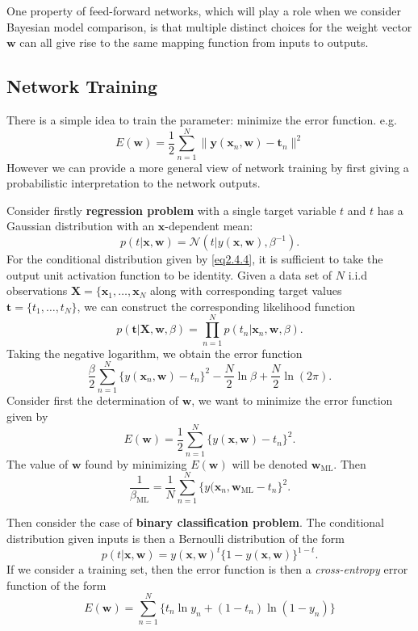 \documentclass{article}
\newcommand{\normD}{\mathcal{N}}
\newcommand{\mrm}{\mathrm}
\newcommand{\mbf}{\mathbf}
\newcommand{\XX}{\mbf X}
\newcommand{\ww}{\mbf w}
\newcommand{\ttt}{\mbf t}
\newcommand{\xx}{\mbf x}
\newcommand{\yy}{\mbf y}
\newcommand{\rev}{^{-1}}
\begin{document}
One property of feed-forward networks, which will play a role when we consider Bayesian model comparison, is that multiple distinct choices for the weight vector
$\ww$ can all give rise to the same mapping function from inputs to outputs.
\subsection{Network Training}
There is a simple idea to train the parameter: minimize the error function. e.g.
\begin{equation}\label{eq2.4.3}
  E(\ww) = \frac12\sum_{n=1}^N\|\yy(\xx_n,\ww)-\ttt_n\|^2
\end{equation}
However we can provide a more general view of network training by first giving a probabilistic interpretation to the network outputs.

Consider firstly \textbf{regression problem} with a single target variable $t$ and $t$ has a Gaussian distribution with an $\xx$-dependent mean:
\begin{equation}\label{eq2.4.4}
p(t|\xx,\ww)=\normD(t|y(\xx,\ww), \beta\rev).
\end{equation}
For the conditional distribution given by \ref{eq2.4.4}, it is sufficient to take the output unit activation function to be identity. Given a data set of $N$  i.i.d observations $\XX =\{\xx_1,\dots,\xx_N$ along with corresponding target values $\ttt = \{t_1,\dots,t_N\}$, we can construct the corresponding likelihood function
\begin{equation}\label{}
  p(\ttt|\XX,\ww,\beta)=\prod_{n=1}^{N}p(t_n|\xx_n,\ww,\beta).
\end{equation}
Taking the negative logarithm, we obtain the error function
\begin{equation}\label{}
  \frac{\beta}{2}\sum_{n=1}^{N}\{y(\xx_n,\ww)-t_n\}^2-\frac{N}{2}\ln \beta+\frac N2\ln(2\pi).
\end{equation}
Consider first the determination of $\ww$, we want to minimize the error function given by
\begin{equation}\label{}
  E(\ww)=\frac12\sum_{n=1}^{N}\{y(\xx,\ww)-t_n\}^2.
\end{equation}
The value of $\ww$ found by minimizing $E(\ww)$ will be denoted $\ww_{\mrm{ML}}$. Then
\begin{equation}\label{}
  \frac{1}{\beta_{\mrm{ML}}}=\frac1N\sum_{n=1}^{N}\{y(\xx_n,\ww_{\mrm{ML}}-t_n\}^2.
\end{equation}

Then consider the case of \textbf{binary classification problem}. The conditional distribution given inputs is then a Bernoulli distribution of the form
\begin{equation}\label{}
  p(t|\xx,\ww) = y(\xx,\ww)^t\{1-y(\xx,\ww)\}^{1-t}.
\end{equation}
If we consider a training set, then the error function is then a \textit{cross-entropy} error function  of the form
\begin{equation}\label{}
  E(\ww) = \sum_{n=1}^{N}\{t_n\ln y_n+(1-t_n)\ln (1-y_n)\}
\end{equation}
\end{document}
